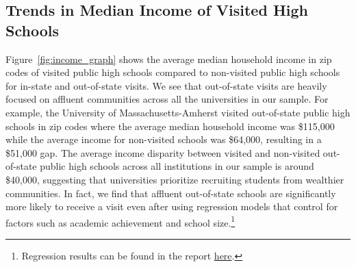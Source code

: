 \documentclass{article}
\begin{document}
\subsection*{Trends in Median Income of Visited High Schools}

Figure~\ref{fig:income_graph} shows the average median household income in zip codes of visited public high schools compared to non-visited public high schools for in-state and out-of-state visits. We see that out-of-state visits are heavily focused on affluent communities across all the universities in our sample. For example, the University of Massachusetts-Amherst visited out-of-state public high schools in zip codes where the average median household income was \$115,000 while the average income for non-visited schools was \$64,000, resulting in a \$51,000 gap. The average income disparity between visited and non-visited out-of-state public high schools across all institutions in our sample is around \$40,000, suggesting that universities prioritize recruiting students from wealthier communities. In fact, we find that affluent out-of-state schools are significantly more likely to receive a visit even after using regression models that control for factors such as academic achievement and school size.\footnote{Regression results can be found in the report \href{https://emraresearch.org/sites/default/files/2019-03/joyce_report.pdf\#page=27}{here}.}
\end{document}
